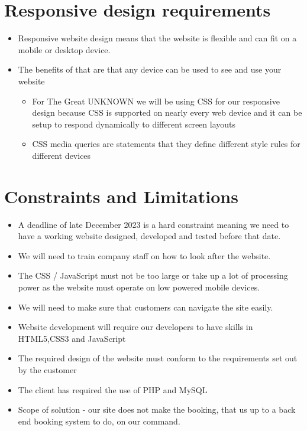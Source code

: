 \documentclass{article}
\begin{document}
\section{Responsive design requirements}
\begin{itemize}
    \item Responsive website design means that the website is flexible and can fit on a mobile or desktop device.
    \item The benefits of that are that any device can be used to see and use your website
    \begin{itemize}
        \item For The Great UNKNOWN we will be using CSS for our responsive design because CSS is supported on nearly every web device and it can be setup to respond dynamically to different screen layouts
        \item CSS media queries are statements that they define different style rules for different devices
    \end{itemize}
\end{itemize}

\section{Constraints and Limitations}
\begin{itemize}
\item A deadline of late December 2023 is a hard constraint meaning we need to have a working website designed, developed and tested before that date.
\item We will need to train company staff on how to look after the website.
\item The CSS / JavaScript must not be too large or take up a lot of processing power as the website must operate on low powered mobile devices.
\item We will need to make sure that customers can navigate the site easily.
\item Website development will require our developers to have skills in HTML5,CSS3 and JavaScript
\item The required design of the website must conform to the requirements set out by the customer
\item The client has required the use of PHP and MySQL
\item Scope of solution - our site does not make the booking, that us up to a back end booking system to do, on our command.
\end{itemize}
\end{document}
